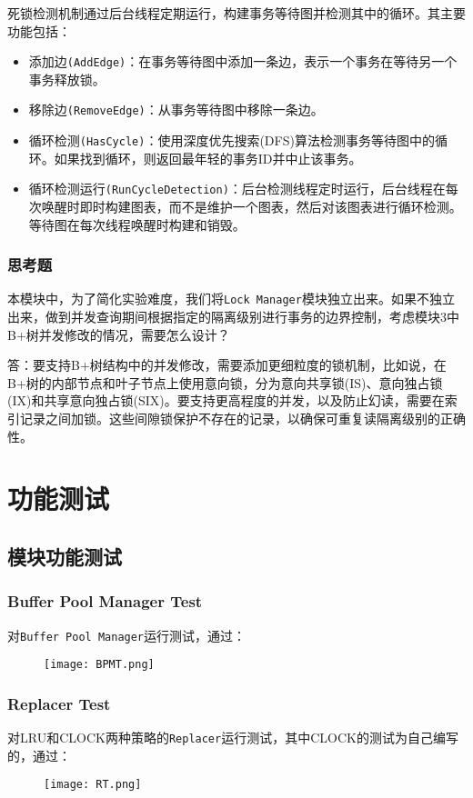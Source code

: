 \documentclass[12pt]{article}
\begin{document}
    死锁检测机制通过后台线程定期运行，构建事务等待图并检测其中的循环。其主要功能包括：
    \begin{itemize}
        \item 添加边\texttt{(AddEdge)}：在事务等待图中添加一条边，表示一个事务在等待另一个事务释放锁。
        \item 移除边\texttt{(RemoveEdge)}：从事务等待图中移除一条边。
        \item 循环检测\texttt{(HasCycle)}：使用深度优先搜索(DFS)算法检测事务等待图中的循环。如果找到循环，则返回最年轻的事务ID并中止该事务。
        \item 循环检测运行\texttt{(RunCycleDetection)}：后台检测线程定时运行，后台线程在每次唤醒时即时构建图表，而不是维护一个图表，然后对该图表进行循环检测。等待图在每次线程唤醒时构建和销毁。
    \end{itemize}

    \subsubsection{思考题}
    本模块中，为了简化实验难度，我们将\texttt{Lock Manager}模块独立出来。如果不独立出来，做到并发查询期间根据指定的隔离级别进行事务的边界控制，考虑模块3中B+树并发修改的情况，需要怎么设计？

    答：要支持B+树结构中的并发修改，需要添加更细粒度的锁机制，比如说，在B+树的内部节点和叶子节点上使用意向锁，分为意向共享锁(IS)、意向独占锁(IX)和共享意向独占锁(SIX)。要支持更高程度的并发，以及防止幻读，需要在索引记录之间加锁。这些间隙锁保护不存在的记录，以确保可重复读隔离级别的正确性。
    \newpage
    \section{功能测试}
    \subsection{模块功能测试}
    \subsubsection{Buffer Pool Manager Test}
    对\texttt{Buffer Pool Manager}运行测试，通过：
    \begin{figure}[H]
    \centering
    \texttt{[image: BPMT.png]}
    \end{figure}

    \subsubsection{Replacer Test}
    对LRU和CLOCK两种策略的\texttt{Replacer}运行测试，其中CLOCK的测试为自己编写的，通过：
    \begin{figure}[H]
    \centering
    \texttt{[image: RT.png]}
    \end{figure}
\end{document}

